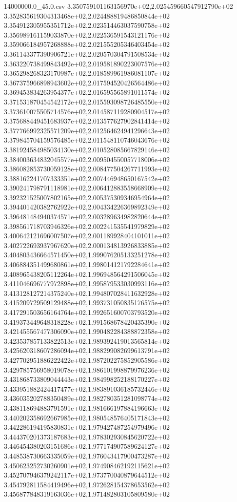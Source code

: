 \begin{filecontents*}{14000000.0_45.0.csv}
3.350759101163156970e+02,2.025459660547912790e+02
3.352835619304313468e+02,2.024488819486850844e+02
3.354912305955351712e+02,2.023514463037590758e+02
3.356989161159033870e+02,2.022536591543121176e+02
3.359066184957268888e+02,2.021555205346403454e+02
3.361143377390906721e+02,2.020570304791508534e+02
3.363220738499843492e+02,2.019581890223007576e+02
3.365298268323170987e+02,2.018589961986081107e+02
3.367375966898943602e+02,2.017594520426564486e+02
3.369453834263954377e+02,2.016595565891011574e+02
3.371531870454542172e+02,2.015593098726485550e+02
3.373610075505714576e+02,2.014587119280904517e+02
3.375688449451683937e+02,2.013577627902841414e+02
3.377766992325571209e+02,2.012564624941296643e+02
3.379845704159576485e+02,2.011548110746043676e+02
3.381924584985034130e+02,2.010528085667829146e+02
3.384003634832045577e+02,2.009504550057718006e+02
3.386082853730059128e+02,2.008477504267711993e+02
3.388162241707333351e+02,2.007446948650167542e+02
3.390241798791118981e+02,2.006412883558668909e+02
3.392321525007802165e+02,2.005375309346954964e+02
3.394401420382762922e+02,2.004334226369892349e+02
3.396481484940374571e+02,2.003289634982820644e+02
3.398561718703946326e+02,2.002241535541979829e+02
3.400642121696007507e+02,2.001189928404101011e+02
3.402722693937967620e+02,2.000134813926833885e+02
3.404803436664571450e+02,1.999076205133251278e+02
3.406884351499680861e+02,1.998014121792284641e+02
3.408965438205112264e+02,1.996948564291506045e+02
3.411046696777972898e+02,1.995879533030993116e+02
3.413128127214375240e+02,1.994807028411632928e+02
3.415209729509129488e+02,1.993731050835176575e+02
3.417291503656164764e+02,1.992651600703793520e+02
3.419373449648318228e+02,1.991568678420435390e+02
3.421455567477306090e+02,1.990482284388872358e+02
3.423537857133822513e+02,1.989392419013565814e+02
3.425620318607286094e+02,1.988299082699613791e+02
3.427702951886222422e+02,1.987202275852905586e+02
3.429785756958019078e+02,1.986101998879976236e+02
3.431868733809044443e+02,1.984998252188170227e+02
3.433951882424417477e+02,1.983891036185732446e+02
3.436035202788350489e+02,1.982780351281098774e+02
3.438118694883791591e+02,1.981666197884196663e+02
3.440202358692667985e+02,1.980548576405171843e+02
3.442286194195830831e+02,1.979427487254979496e+02
3.444370201373187683e+02,1.978302930845620722e+02
3.446454380203151686e+02,1.977174907589624127e+02
3.448538730663335059e+02,1.976043417900473287e+02
3.450623252730260901e+02,1.974908462192115621e+02
3.452707946379242117e+02,1.973770040879644512e+02
3.454792811584419496e+02,1.972628154378653562e+02
3.456877848319163036e+02,1.971482803105809580e+02

\end{filecontents*}
